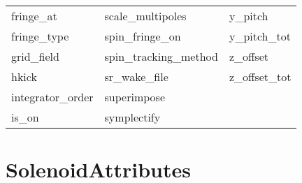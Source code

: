 \begin{tabular}{lll}
fringe_at                   & scale_multipoles            & y_pitch                     \\
fringe_type                 & spin_fringe_on              & y_pitch_tot                 \\
grid_field                  & spin_tracking_method        & z_offset                    \\
hkick                       & sr_wake_file                & z_offset_tot                \\
integrator_order            & superimpose                 &                             \\
is_on                       & symplectify                 &                             \\
 \bottomrule
 \end{tabular}
 \vfill
 
 \section{SolenoidAttributes}
 \label{s:list.solenoid}
 
